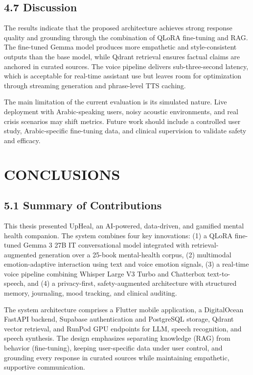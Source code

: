 \documentclass[
  letterpaper,
  12pt,
  a4paper,
  openany]{report}
\begin{document}
\section{4.7 Discussion}\label{discussion}

The results indicate that the proposed architecture achieves strong
response quality and grounding through the combination of QLoRA
fine-tuning and RAG. The fine-tuned Gemma model produces more empathetic
and style-consistent outputs than the base model, while Qdrant retrieval
ensures factual claims are anchored in curated sources. The voice
pipeline delivers sub-three-second latency, which is acceptable for
real-time assistant use but leaves room for optimization through
streaming generation and phrase-level TTS caching.

The main limitation of the current evaluation is its simulated nature.
Live deployment with Arabic-speaking users, noisy acoustic environments,
and real crisis scenarios may shift metrics. Future work should include
a controlled user study, Arabic-specific fine-tuning data, and clinical
supervision to validate safety and efficacy.


\chapter{CONCLUSIONS}\label{sec-conclusions}

\section{5.1 Summary of Contributions}\label{summary-of-contributions}

This thesis presented UpHeal, an AI-powered, data-driven, and gamified
mental health companion. The system combines four key innovations: (1) a
QLoRA fine-tuned Gemma 3 27B IT conversational model integrated with
retrieval-augmented generation over a 25-book mental-health corpus, (2)
multimodal emotion-adaptive interaction using text and voice emotion
signals, (3) a real-time voice pipeline combining Whisper Large V3 Turbo
and Chatterbox text-to-speech, and (4) a privacy-first, safety-augmented
architecture with structured memory, journaling, mood tracking, and
clinical auditing.

The system architecture comprises a Flutter mobile application, a
DigitalOcean FastAPI backend, Supabase authentication and PostgreSQL
storage, Qdrant vector retrieval, and RunPod GPU endpoints for LLM,
speech recognition, and speech synthesis. The design emphasizes
separating knowledge (RAG) from behavior (fine-tuning), keeping
user-specific data under user control, and grounding every response in
curated sources while maintaining empathetic, supportive communication.
\end{document}

